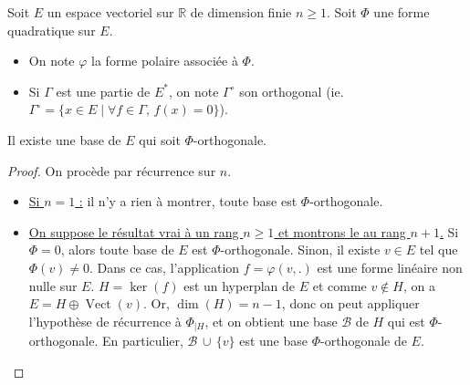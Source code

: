 






  Soit $E$ un espace vectoriel sur $\mathbb{R}$ de dimension finie $n \geq 1$. Soit $\Phi$ une forme quadratique sur $E$.

  \begin{notation}
    \begin{itemize}
      \item On note $\varphi$ la forme polaire associée à $\Phi$.
      \item Si $\Gamma$ est une partie de $E^*$, on note $\Gamma^\circ$ son orthogonal (ie. $\Gamma^\circ = \{ x \in E \mid \forall f \in \Gamma, \, f(x) = 0 \}$).
    \end{itemize}
  \end{notation}

  \begin{lemma}
    \label{loi-d-inertie-de-sylvester-1}
    Il existe une base de $E$ qui soit $\Phi$-orthogonale.
  \end{lemma}

  \begin{proof}
    On procède par récurrence sur $n$.
    \begin{itemize}
      \item \uline{Si $n = 1$ :} il n'y a rien à montrer, toute base est $\Phi$-orthogonale.
      \item \uline{On suppose le résultat vrai à un rang $n \geq 1$ et montrons le au rang $n + 1$.} Si $\Phi = 0$, alors toute base de $E$ est $\Phi$-orthogonale. Sinon, il existe $v \in E$ tel que $\Phi(v) \neq 0$. Dans ce cas, l'application $f = \varphi(v, .)$ est une forme linéaire non nulle sur $E$.
      \newpar
      $H = \ker(f)$ est un hyperplan de $E$ et comme $v \notin H$, on a $E = H \oplus \operatorname{Vect}(v)$. Or, $\dim(H) = n-1$, donc on peut appliquer l'hypothèse de récurrence à $\Phi_{|H}$, et on obtient une base $\mathcal{B}$ de $H$ qui est $\Phi$-orthogonale. En particulier, $\mathcal{B} \, \cup \, \{ v \}$ est une base $\Phi$-orthogonale de $E$.
    \end{itemize}
  \end{proof}

